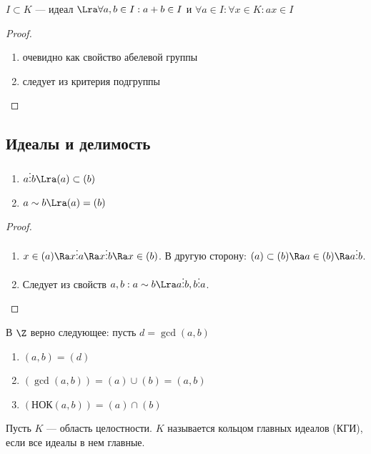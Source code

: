 \begin{proposition}
    \(I \subset K\) --- идеал \(\Lra \forall a, b \in I: a + b \in I\) и \(\forall a \in I: \forall x \in K: ax \in I\)
\end{proposition}
\begin{proof}
    \begin{enumerate}
        \item[\(\Ra\)] очевидно как свойство абелевой группы
        \item[\(\La\)] следует из критерия подгруппы
    \end{enumerate}
\end{proof}

\subsection{Идеалы и делимость}
\begin{proposition}
    \begin{enumerate}
        \item \(a \vdots b \Lra (a) \subset (b)\)
        \item \(a \sim b \Lra (a) = (b)\)
    \end{enumerate}
\end{proposition}
\begin{proof}
    \begin{enumerate}
        \item \(x \in (a) \Ra x \vdots a \Ra x \vdots b \Ra x \in (b)\). В другую сторону: \((a) \subset (b) \Ra a \in (b) \Ra a \vdots b\).
        \item Следует из свойств \(a, b: a \sim b \Lra a \vdots b, b \vdots a\).
    \end{enumerate}
\end{proof}

\begin{note}
    В \(\Z\) верно следующее: пусть \(d = \gcd(a, b)\)
    \begin{enumerate}
        \item \((a, b) = (d)\)
        \item \((\gcd(a, b)) = (a) \cup (b) = (a, b)\)
        \item \((\text{НОК}(a, b)) = (a) \cap (b)\)
    \end{enumerate}
\end{note}

\begin{definition}
    Пусть \(K\) --- область целостности. \(K\) называется кольцом главных идеалов (КГИ), если все идеалы в нем главные.
\end{definition}

